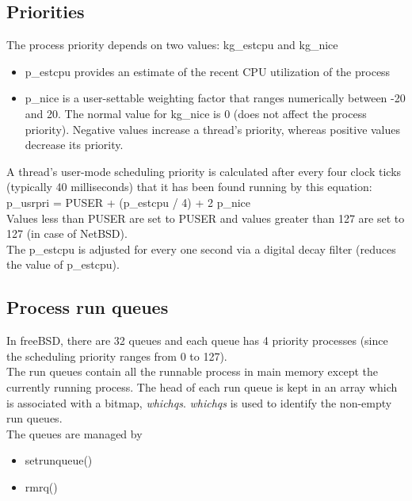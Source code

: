 \documentclass[11pt]{article}
\begin{document}
\subsection{Priorities}
\label{sec:org32b7c91}
The process priority depends on two values: kg\_estcpu and kg\_nice\\
\begin{itemize}
\item p\_estcpu provides an estimate of the recent CPU utilization of the process\\
\item p\_nice is a user-settable weighting factor that ranges numerically between -20 and 20. The normal value for kg\_nice is 0 (does not affect the process priority). Negative values increase a thread's priority, whereas positive values decrease its priority.\\
\end{itemize}
A thread's user-mode scheduling priority is calculated after every four clock ticks (typically 40 milliseconds) that it has been found running by this equation:\\
p\_usrpri = PUSER + (p\_estcpu / 4) + 2 p\_nice\\

Values less than PUSER are set to PUSER and values greater than 127 are set to 127 (in case of NetBSD).\\

The p\_estcpu is adjusted for every one second via a digital decay filter (reduces the value of p\_estcpu).\\

\subsection{Process run queues}
\label{sec:orgb9fd61e}
In freeBSD, there are 32 queues and each queue has 4 priority processes (since the scheduling priority ranges from 0 to 127).\\

The run queues contain all the runnable process in main memory except the currently running process. The head of each run queue is kept in an array which is associated with a bitmap, \emph{whichqs}. \emph{whichqs} is used to identify the non-empty run queues.\\

The queues are managed by\\
\begin{itemize}
\item setrunqueue()\\
\item rmrq()\\
\end{itemize}
\end{document}
